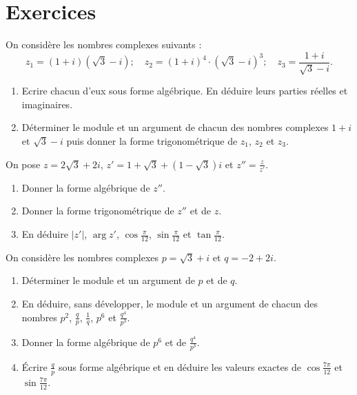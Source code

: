 \TCDLessonStyleOff
\clearpage
\providecommand{\Arg}[1]{\mathrm{Arg}\left( #1 \right)}
\section{Exercices}
%
\begin{exo}
      On consid\`ere les nombres complexes suivants :
            \[
                  z_1 = (1+i) (\sqrt{3}-i)
 ; \quad
                  z_2 = (1+i)^4 \cdot (\sqrt{3}-i)^3
 ; \quad
                  z_3 = \frac{1+i}{\sqrt{3}-i}
                  .
            \]
      \begin{enumerate}
            \item Ecrire chacun d'eux sous forme alg\'ebrique.
                  En d\'eduire leurs parties r\'eelles et imaginaires.
            \item D\'eterminer le module et un argument de chacun des nombres complexes $1+i$ et $\sqrt{3}-i$
                  puis donner la forme trigonom\'etrique de $z_1$, $z_2$ et $z_3$.
      \end{enumerate}
\end{exo}
%
\begin{exo}
      On pose $z=2\sqrt{3} + 2i$, $z' = 1 + \sqrt{3} + (1-\sqrt{3})i$ et $z'' = \frac{z}{z'}$.
      \begin{enumerate}
            \item Donner la forme alg\'ebrique de $z''$.
            \item Donner la forme trigonom\'etrique de $z''$ et de $z$.
            \item En d\'eduire $|z'|$, $\arg z'$, $\cos \frac{\pi}{12}$, $\sin \frac{\pi}{12}$ et $\tan \frac{\pi}{12}$.
      \end{enumerate}
\end{exo}
%
\begin{exo}
	On consid\`ere les nombres complexes $p = \sqrt{3} + i$ et $q = -2 + 2i$.
	\begin{enumerate}
		\item D\'eterminer le module et un argument de $p$ et de $q$.
		\item En d\'eduire, sans d\'evelopper, le module et un argument de chacun des nombres
		      $p^2$, $\frac{q}{p}$, $\frac{1}{q}$, $p^6$ et $\frac{q^4}{p^3}$.
		\item Donner la forme alg\'ebrique de $p^6$ et de $\frac{q^4}{p^3}$.
		\item \'Ecrire $\frac{q}{p}$ sous forme alg\'ebrique et en d\'eduire les valeurs exactes de
		      $\cos \frac{7\pi}{12}$ et $\sin \frac{7\pi}{12}$.
	\end{enumerate}
\end{exo}
